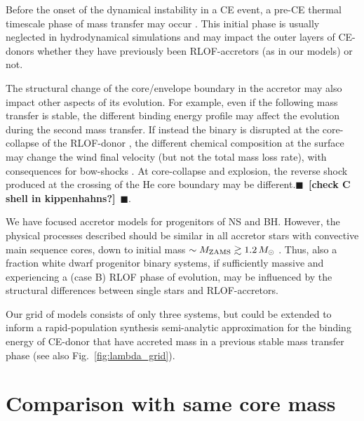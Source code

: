 \documentclass[twocolumn,twocolappendix,trackchanges]{aastex63}
\DeclareRobustCommand{\Figref}[1]{Fig.~\ref{#1}}
\newcommand{\todo}[1]{{\large $\blacksquare$~\textbf{\color{red}[#1]}}~$\blacksquare$}
\begin{document}
{Before the onset of the
dynamical instability in a CE event, a pre-CE thermal timescale phase
of mass transfer may occur \citep[e.g.,][]{pejcha:17,
  blagorodnova:2021}. This initial phase is usually neglected in
hydrodynamical simulations and may impact the outer layers of
CE-donors whether they have previously been RLOF-accretors (as in our
models) or not.

The structural change of the core/envelope boundary in the accretor
may also impact other aspects of its evolution. For example, even if
the following mass transfer is stable, the different binding energy
profile may affect the evolution during the second mass transfer. If
instead the binary is disrupted at the core-collapse of the RLOF-donor
\citep[e.g.,][]{blaauw:1961, renzo:2019walk}, the different chemical
composition at the surface \citep[e.g.,][]{blaauw:93, renzo:2021zoph}
may change the wind final velocity (but not the total mass loss rate),
with consequences for bow-shocks \citep[e.g.,][]{bodensteiner:18,
  moutzouri:22}. At core-collapse and explosion, the reverse shock
produced at the crossing of the He core boundary may be
different.\todo{check C shell in kippenhahns?}.

We have focused accretor models for progenitors of NS and BH. However,
the physical processes described should be similar in all accretor
stars with convective main sequence cores, down to initial mass
$\sim{}M_{\rm ZAMS}\gtrsim 1.2\,M_\odot$ \citep[see also][]{wang:20}.
Thus, also a fraction white dwarf progenitor binary systems, if
sufficiently massive and experiencing a (case B) RLOF phase of
evolution, may be influenced by the structural differences between
single stars and RLOF-accretors.

Our grid of models consists of only three systems, but could be
extended to inform a rapid-population synthesis semi-analytic
approximation for the binding energy of CE-donor that have accreted
mass in a previous stable mass transfer phase (see also \Figref{fig:lambda_grid}).



\appendix

\section{Comparison with same core mass}

}
\end{document}
